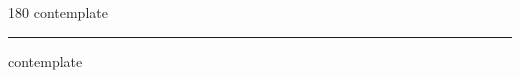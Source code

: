 
\begin{frame}
\begin{center}
\begin{turn}{180}
{\fontsize{2.5cm}{1em}\selectfont contemplate}
\end{turn}
\vspace{1em}\par  
\hrule
\vspace{1em}\par  
{\fontsize{2.5cm}{1em}\selectfont contemplate}
\end{center}
\end{frame}
